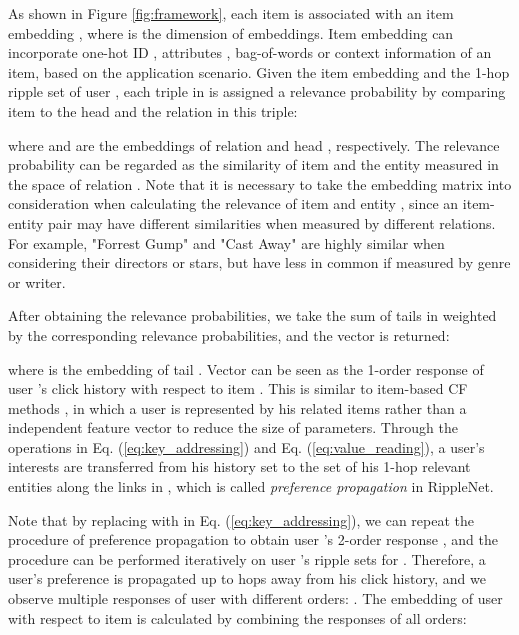 \documentclass[sigconf]{acmart}
\begin{document}
		As shown in Figure \ref{fig:framework}, each item  is associated with an item embedding , where  is the dimension of embeddings.
		Item embedding can incorporate one-hot ID \cite{koren2008factorization}, attributes \cite{wang2018shine}, bag-of-words \cite{wang2018dkn} or context information \cite{sun2017collaborative} of an item, based on the application scenario.
		Given the item embedding  and the 1-hop ripple set  of user , each triple  in  is assigned a relevance probability by comparing item  to the head  and the relation  in this triple:
		
		where  and  are the embeddings of relation  and head , respectively.
		The relevance probability  can be regarded as the similarity of item  and the entity  measured in the space of relation .
		Note that it is necessary to take the embedding matrix  into consideration when calculating the relevance of item  and entity , since an item-entity pair may have different similarities when measured by different relations.
		For example, "Forrest Gump" and "Cast Away" are highly similar when considering their directors or stars, but have less in common if measured by genre or writer.
		
		After obtaining the relevance probabilities, we take the sum of tails in  weighted by the corresponding relevance probabilities, and the vector  is returned:
		
		where  is the embedding of tail .
		Vector  can be seen as the 1-order response of user 's click history  with respect to item .
		This is similar to item-based CF methods \cite{koren2008factorization,wang2018dkn}, in which a user is represented by his related items rather than a independent feature vector to reduce the size of parameters.
		Through the operations in Eq. (\ref{eq:key_addressing}) and Eq. (\ref{eq:value_reading}), a user's interests are transferred from his history set  to  the set of his 1-hop relevant entities  along the links in , which is called \textit{preference propagation} in RippleNet.
		
		Note that by replacing  with  in Eq. (\ref{eq:key_addressing}), we can repeat the procedure of preference propagation to obtain user 's 2-order response , and the procedure can be performed iteratively on user 's ripple sets  for .
		Therefore, a user's preference is propagated up to  hops away from his click history, and we observe multiple responses of user  with different orders: .
		The embedding of user  with respect to item  is calculated by combining the responses of all orders:
		
\end{document}

